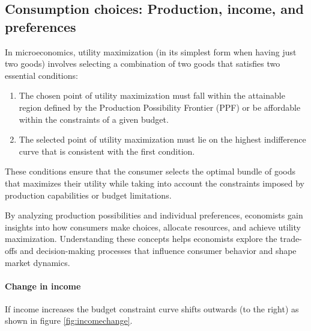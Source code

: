 \documentclass[
  12pt,
  oneside]{book}
\providecommand{\tightlist}{%
  \setlength{\itemsep}{0pt}\setlength{\parskip}{0pt}}
\theoremstyle{definition}
\theoremstyle{definition}
\theoremstyle{definition}
\theoremstyle{definition}
\theoremstyle{remark}
\begin{document}
\hypertarget{consumption-choices-production-income-and-preferences}{%
\subsection{Consumption choices: Production, income, and preferences}\label{consumption-choices-production-income-and-preferences}}

In microeconomics, utility maximization (in its simplest form when having just two goods) involves selecting a combination of two goods that satisfies two essential conditions:

\begin{enumerate}
\def\labelenumi{\arabic{enumi}.}
\tightlist
\item
  The chosen point of utility maximization must fall within the attainable region defined by the Production Possibility Frontier (PPF) or be affordable within the constraints of a given budget.
\item
  The selected point of utility maximization must lie on the highest indifference curve that is consistent with the first condition.
\end{enumerate}

These conditions ensure that the consumer selects the optimal bundle of goods that maximizes their utility while taking into account the constraints imposed by production capabilities or budget limitations.

By analyzing production possibilities and individual preferences, economists gain insights into how consumers make choices, allocate resources, and achieve utility maximization. Understanding these concepts helps economists explore the trade-offs and decision-making processes that influence consumer behavior and shape market dynamics.

\hypertarget{change-in-income}{%
\paragraph*{Change in income}\label{change-in-income}}

If income increases the budget constraint curve shifts outwards (to the right) as shown in figure \ref{fig:incomechange}.
\end{document}
